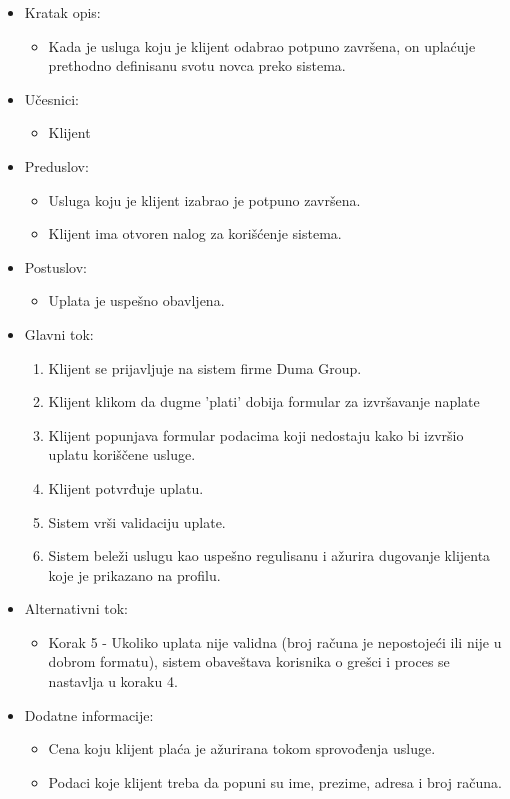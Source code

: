 \documentclass[a4paper]{article}
\begin{document}
\begin{itemize}
    \item Kratak opis: 
    \begin{itemize}
        \item Kada je usluga koju je klijent odabrao potpuno završena, on uplaćuje prethodno definisanu svotu novca preko sistema.
    \end{itemize}
    \item Učesnici:
        \begin{itemize}
        \item Klijent
    \end{itemize}
    \item Preduslov:
        \begin{itemize}
            \item Usluga koju je klijent izabrao je potpuno završena.
            \item Klijent ima otvoren nalog za korišćenje sistema.
        \end{itemize}
    \item Postuslov:
        \begin{itemize}
            \item Uplata je uspešno obavljena.
            \end{itemize}
    \item Glavni tok:
        \begin{enumerate}
            \item Klijent se prijavljuje na sistem firme Duma Group.
            \item Klijent klikom da dugme 'plati' dobija formular za izvršavanje naplate
            \item Klijent popunjava formular podacima koji nedostaju kako bi izvršio uplatu koriščene usluge.
            \item Klijent potvrđuje uplatu.
            \item Sistem vrši validaciju uplate.
            \item Sistem beleži uslugu kao uspešno regulisanu i ažurira dugovanje klijenta koje je prikazano na profilu.
        \end{enumerate}
    \item Alternativni tok:
        \begin{itemize}
            \item Korak 5 - Ukoliko uplata nije validna (broj računa je nepostojeći ili nije u dobrom formatu), sistem obaveštava korisnika o grešci i proces se nastavlja u koraku 4.  
    \end{itemize}
    \item Dodatne informacije:
        \begin{itemize}
            \item Cena koju klijent plaća je ažurirana tokom sprovođenja usluge.
            \item Podaci koje klijent treba da popuni su ime, prezime, adresa i broj računa.
        \end{itemize}
\end{itemize}
\end{document}
